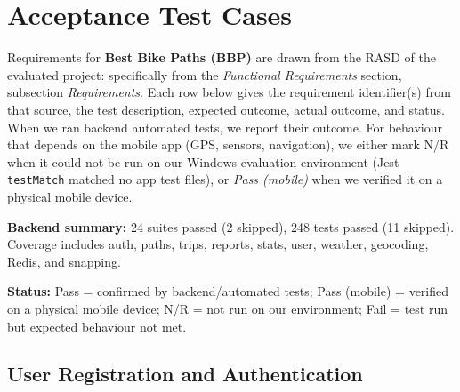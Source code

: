 \section{Acceptance Test Cases}
\label{sec:acceptance_test_cases}

Requirements for \textbf{Best Bike Paths (BBP)} are drawn from the RASD of the evaluated project: specifically from the \emph{Functional Requirements} section, subsection \emph{Requirements}. Each row below gives the requirement identifier(s) from that source, the test description, expected outcome, actual outcome, and status. When we ran backend automated tests, we report their outcome. For behaviour that depends on the mobile app (GPS, sensors, navigation), we either mark N/R when it could not be run on our Windows evaluation environment (Jest \texttt{testMatch} matched no app test files), or \emph{Pass (mobile)} when we verified it on a physical mobile device.

\textbf{Backend summary:} 24 suites passed (2 skipped), 248 tests passed (11 skipped). Coverage includes auth, paths, trips, reports, stats, user, weather, geocoding, Redis, and snapping.

\textbf{Status:}  Pass = confirmed by backend/automated tests;  Pass (mobile) = verified on a physical mobile device; N/R = not run on our environment;  Fail = test run but expected behaviour not met.

\subsection{User Registration and Authentication}
\label{subsec:auth_tests}

